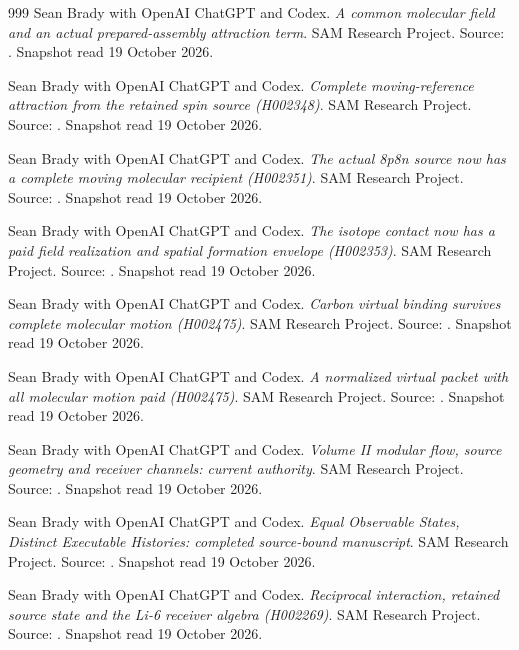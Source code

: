 \begin{thebibliography}{999}
 Sean Brady with OpenAI ChatGPT and Codex. \emph{A common molecular field and an actual prepared-assembly attraction term}. SAM Research Project. Source: . Snapshot read 19 October 2026.

 Sean Brady with OpenAI ChatGPT and Codex. \emph{Complete moving-reference attraction from the retained spin source (H002348)}. SAM Research Project. Source: . Snapshot read 19 October 2026.

 Sean Brady with OpenAI ChatGPT and Codex. \emph{The actual 8p8n source now has a complete moving molecular recipient (H002351)}. SAM Research Project. Source: . Snapshot read 19 October 2026.

 Sean Brady with OpenAI ChatGPT and Codex. \emph{The isotope contact now has a paid field realization and spatial formation envelope (H002353)}. SAM Research Project. Source: . Snapshot read 19 October 2026.

 Sean Brady with OpenAI ChatGPT and Codex. \emph{Carbon virtual binding survives complete molecular motion (H002475)}. SAM Research Project. Source: . Snapshot read 19 October 2026.

 Sean Brady with OpenAI ChatGPT and Codex. \emph{A normalized virtual packet with all molecular motion paid (H002475)}. SAM Research Project. Source: . Snapshot read 19 October 2026.

 Sean Brady with OpenAI ChatGPT and Codex. \emph{Volume II modular flow, source geometry and receiver channels: current authority}. SAM Research Project. Source: . Snapshot read 19 October 2026.

 Sean Brady with OpenAI ChatGPT and Codex. \emph{Equal Observable States, Distinct Executable Histories: completed source-bound manuscript}. SAM Research Project. Source: . Snapshot read 19 October 2026.

 Sean Brady with OpenAI ChatGPT and Codex. \emph{Reciprocal interaction, retained source state and the Li-6 receiver algebra (H002269)}. SAM Research Project. Source: . Snapshot read 19 October 2026.


\end{thebibliography}
